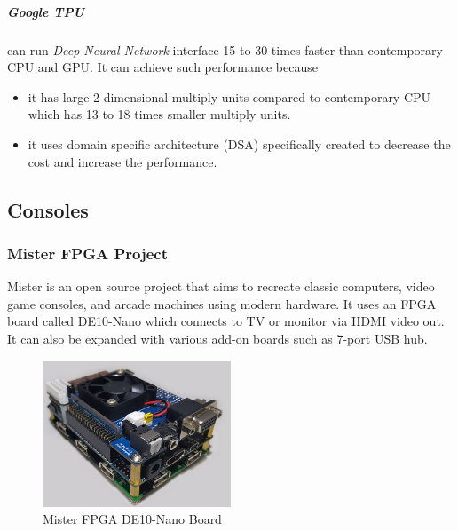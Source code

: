 \documentclass[a4paper,12pt]{article}
\begin{document}
    \subparagraph{Google TPU}
    can run \textit{Deep Neural Network} interface 15-to-30 times faster  than contemporary CPU and GPU. %
    It can achieve such performance because
    \begin{itemize}
        \item it has large 2-dimensional multiply units compared to contemporary CPU which has 13 to 18 times smaller multiply units.
        \item it uses domain specific architecture (DSA) specifically created to decrease the cost and increase the performance. 
    \end{itemize}

    \subsection{Consoles}

    \subsubsection{Mister FPGA Project}
    Mister is an open source project that aims to recreate classic computers, video game consoles, and arcade machines using modern hardware. It uses an FPGA board called DE10-Nano which connects to TV or monitor via HDMI video out. It can also be expanded with various add-on boards such as 7-port USB hub.

    \begin{figure}[h]
    \centering
    \includegraphics[width=0.5\textwidth]{images/mister.png} 
    \caption{Mister FPGA DE10-Nano Board}
    \end{figure}
\end{document}
